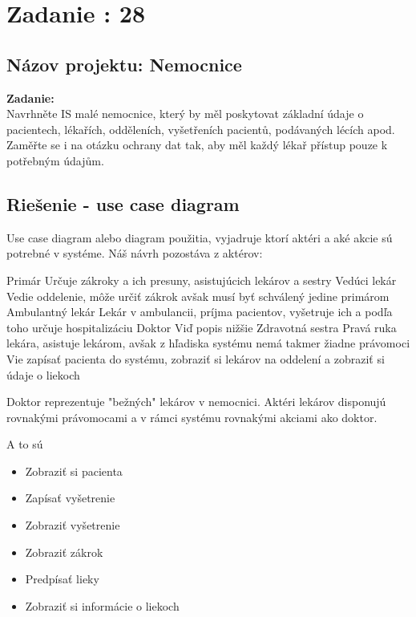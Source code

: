 \section{Zadanie : 28}

\subsection{Názov projektu: Nemocnice}

\noindent\textbf{Zadanie:} \\
\indent Navrhněte IS malé nemocnice, který by měl poskytovat základní údaje o pacientech, lékařích, odděleních, vyšetřeních
pacientů, podávaných lécích apod. Zaměřte se i na otázku ochrany dat tak, aby měl každý lékař přístup pouze k potřebným
údajům.

\subsection{Riešenie - use case diagram}
Use case diagram alebo diagram použitia, vyjadruje ktorí aktéri a aké akcie sú potrebné v systéme.
Náš návrh pozostáva z aktérov:
\begin{outline}
    \1 Primár
    \2 Určuje zákroky a ich presuny, asistujúcich lekárov a sestry
    \1 Vedúci lekár
    \2 Vedie oddelenie, môže určiť zákrok avšak musí byť schválený jedine primárom
    \1 Ambulantný lekár
    \2 Lekár v ambulancii, príjma pacientov, vyšetruje ich a podľa toho určuje hospitalizáciu
    \1 Doktor
    \2 Viď popis nižšie
    \1 Zdravotná sestra
    \2 Pravá ruka lekára, asistuje lekárom, avšak z hľadiska systému nemá takmer žiadne právomoci
    \2 Vie zapísať pacienta do systému, zobraziť si lekárov na oddelení a zobraziť si údaje o liekoch
\end{outline}

Doktor reprezentuje "bežných"  lekárov v nemocnici.
Aktéri lekárov disponujú rovnakými právomocami a v rámci systému rovnakými akciami ako doktor.

A to sú
\begin{itemize}
    \item Zobraziť si pacienta
    \item Zapísať vyšetrenie
    \item Zobraziť vyšetrenie
    \item Zobraziť zákrok
    \item Predpísať lieky
    \item Zobraziť si informácie o liekoch
\end{itemize}


